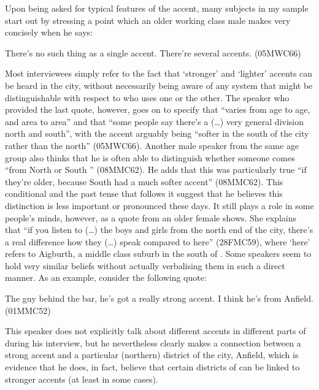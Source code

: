 Upon being asked for typical features of the  accent, many subjects in my sample start out by stressing a point which an older working class male makes very concisely when he says:
\begin{example}
	There's no such thing as a single  accent. There're several  accents. (05MWC66)
\end{example}
Most interviewees simply refer to the fact that `stronger' and `lighter' accents can be heard in the city, without necessarily being aware of any system that might be distinguishable with respect to who uses one or the other.
The speaker who provided the last quote, however, goes on to specify that  ``varies from age to age, and area to area'' and that ``some people say there's a (\ldots) very general division north and south'', with the accent arguably being ``softer in the south of the city rather than the north'' (05MWC66).
Another male speaker from the same age group also thinks that he is often able to distinguish whether someone comes ``from North  or South '' (08MMC62).
He adds that this was particularly true ``if they're older, because South  had a much softer accent'' (08MMC62).
This conditional and the past tense that follows it suggest that he believes this distinction is less important or pronounced these days.
It still plays a role in some people's minds, however, as a quote from an older female shows.
She explains that ``if you listen to (\ldots) the boys and girls from the north end of the city, there's a real difference how they (\ldots) speak compared to here'' (28FMC59), where `here' refers to Aigburth, a middle class suburb in the south of .
Some speakers seem to hold very similar beliefs without actually verbalising them in such a direct manner.
As an example, consider the following quote:
\begin{example}
	The guy behind the bar, he's got a really strong accent. I think he's from Anfield. (01MMC52)
\end{example}
This speaker does not explicitly talk about different accents in different parts of  during his interview, but he nevertheless clearly makes a connection between a strong accent and a particular (northern) district of the city, Anfield, which is evidence that he does, in fact, believe that certain districts of  can be linked to stronger accents (at least in some cases).

